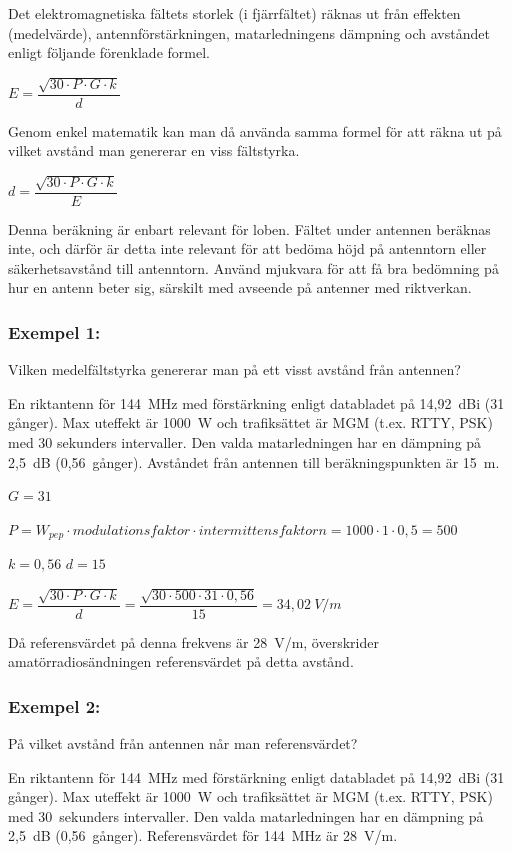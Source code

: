 Det elektromagnetiska fältets storlek (i fjärrfältet) räknas ut från
effekten (medelvärde), antennförstärkningen, matarledningens dämpning
och avståndet enligt följande förenklade formel.

\(E=\dfrac{\sqrt{30 \cdot P \cdot G \cdot k}}{d}\)

Genom enkel matematik kan man då använda samma formel för att räkna
ut på vilket avstånd man genererar en viss fältstyrka.

\(d=\dfrac{\sqrt{30 \cdot P \cdot G \cdot k}}{E}\)

Denna beräkning är enbart relevant för loben. Fältet under antennen
beräknas inte, och därför är detta inte relevant för att bedöma höjd
på antenntorn eller säkerhetsavstånd till antenntorn. Använd mjukvara för
att få bra bedömning på hur en antenn beter sig, särskilt med avseende på
antenner med riktverkan.

\subsubsection{Exempel 1:}

Vilken medelfältstyrka genererar man på ett visst avstånd från antennen?

En riktantenn för 144~MHz med förstärkning enligt databladet på
14,92~dBi (31 gånger).
Max uteffekt är 1000~W och trafiksättet är MGM (t.ex. RTTY, PSK) med
30 sekunders intervaller.
Den valda matarledningen har en dämpning på 2,5~dB (0,56~gånger).
Avståndet från antennen till beräkningspunkten är 15~m.

\(G = 31\)

\(P = W_{pep} \cdot modulationsfaktor \cdot intermittensfaktorn
= 1000 \cdot 1 \cdot 0,5 = 500\)

\(k = 0,56\)
\(d = 15\)

\(E = \dfrac{\sqrt{30 \cdot P \cdot G \cdot k}}{d}
= \dfrac{\sqrt{30 \cdot 500 \cdot 31 \cdot 0,56}}{15}
= 34,02\ V/m\)

Då referensvärdet på denna frekvens är 28~V/m, överskrider
amatörradiosändningen referensvärdet på detta avstånd.

\subsubsection{Exempel 2:}

På vilket avstånd från antennen når man referensvärdet?

En riktantenn för 144~MHz med förstärkning enligt databladet på
14,92~dBi (31 gånger).
Max uteffekt är 1000~W och trafiksättet är MGM (t.ex. RTTY, PSK) med
30~sekunders intervaller.
Den valda matarledningen har en dämpning på 2,5~dB (0,56~gånger).
Referensvärdet för 144~MHz är 28~V/m.

